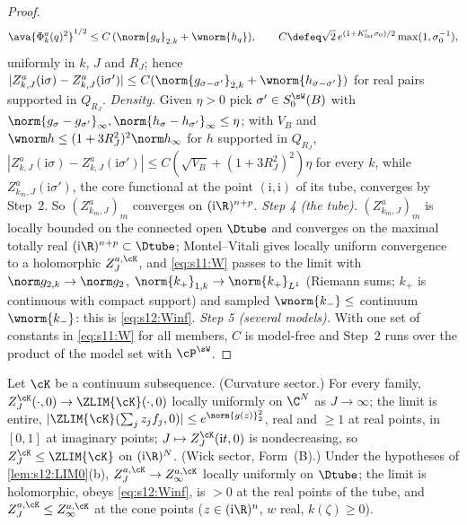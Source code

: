 \begin{proof}
\[
{\ava{\Phi^a_k(q)^2}}^{1/2}\le C\,(\norm{g_q}_{2,k}+\wnorm{h_q}),\qquad C\defeq\sqrt2\,e^{(1+K'_{\mathrm{lat}}\sigma_0)/2}\max(1,\sigma_0^{-1}),
\]
uniformly in $k$, $J$ and $R_J$; hence $|Z^a_{k,J}(\mathrm i\sigma)-Z^a_{k,J}(\mathrm i\sigma')|\le C(\norm{g_{\sigma-\sigma'}}_{2,k}+\wnorm{h_{\sigma-\sigma'}})$ for real pairs supported in $Q_{R_J}$. \emph{Density.} Given $\eta>0$ pick $\sigma'\in S^{\sW}_0(B)$ with $\norm{g_\sigma-g_{\sigma'}}_\infty,\norm{h_\sigma-h_{\sigma'}}_\infty\le\eta$; with $V_B$ and $\wnorm h\le(1+3R_J^2)^2\norm h_\infty$ for $h$ supported in $Q_{R_J}$, $|Z^a_{k,J}(\mathrm i\sigma)-Z^a_{k,J}(\mathrm i\sigma')|\le C(\sqrt{V_B}+(1+3R_J^2)^2)\eta$ for every $k$, while $Z^a_{k_m,J}(\mathrm i\sigma')$, the core functional at the point $(\mathrm i,\mathrm i)$ of its tube, converges by Step~2. So $(Z^a_{k_m,J})_m$ converges on $(\mathrm i\R)^{n+p}$.
\emph{Step 4 (the tube).} $(Z^a_{k_m,J})_m$ is locally bounded on the connected open $\Dtube$ and converges on the maximal totally real $(\mathrm i\R)^{n+p}\subset\Dtube$; Montel--Vitali gives locally uniform convergence to a holomorphic $Z^{a,\cK}_J$, and \eqref{eq:s11:W} passes to the limit with $\norm g_{2,k}\to\norm g_2$, $\norm{k_+}_{1,k}\to\norm{k_+}_{L^1}$ (Riemann sums; $k_+$ is continuous with compact support) and sampled $\wnorm{k_-}\le$ continuum $\wnorm{k_-}$: this is \eqref{eq:s12:Winf}.
\emph{Step 5 (several models).} With one set of constants in \eqref{eq:s11:W} for all members, $C$ is model-free and Step~2 runs over the product of the model set with $\cP^{\sW}$.
\end{proof}

\begin{lemma}\label{lem:s12:LIM1}
Let $\cK$ be a continuum subsequence. \textup{(Curvature sector.)} For every family, $Z^{\cK}_J(\cdot,0)\to\ZLIM{\cK}(\cdot,0)$ locally uniformly on $\C^N$ as $J\to\infty$; the limit is entire, $|\ZLIM{\cK}(\sum_jz_jf_j,0)|\le e^{\norm{g(z)}_2^2}$, real and $\ge1$ at real points, in $[0,1]$ at imaginary points; $J\mapsto Z^{\cK}_J(\mathrm it,0)$ is nondecreasing, so $Z^{\cK}_J\le\ZLIM{\cK}$ on $(\mathrm i\R)^N$. \textup{(Wick sector, Form~(B).)} Under the hypotheses of \cref{lem:s12:LIM0}(b), $Z^{a,\cK}_J\to Z^{a,\cK}_\infty$ locally uniformly on $\Dtube$; the limit is holomorphic, obeys \eqref{eq:s12:Winf}, is $>0$ at the real points of the tube, and $Z^{a,\cK}_J\le Z^{a,\cK}_\infty$ at the cone points ($z\in(\mathrm i\R)^n$, $w$ real, $k(\zeta)\ge0$).
\end{lemma}

